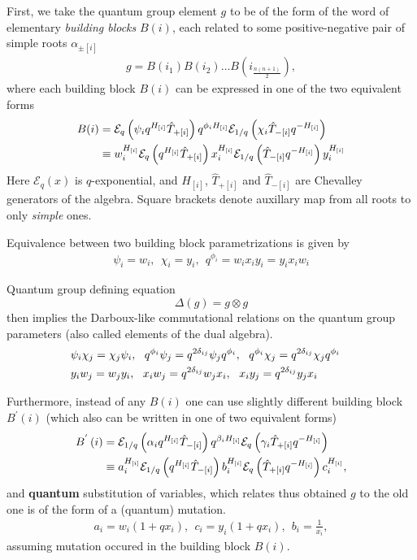 \documentclass{article}
\newcommand{\lb}{\left (}
\newcommand{\rb}{\right )}
\newcommand{\lsb}{\left [}
\newcommand{\rsb}{\right ]}
\newcommand{\be}{\begin{eqnarray}}
\newcommand{\ee}{\end{eqnarray}}
\newcommand {\?}{\textit{???}}
\newcommand{\me}[0]{\mathcal{E}}
\newcommand{\hT}[0]{\hat{T}}
\newcommand{\Bp}[1]{B^{'}\lb #1 \rb}
\def\dg{\Delta (g)}
\def\gog{g \otimes g}
\begin{document}
First, we take the quantum group element $g$ to be of the form
of the word of elementary {\it building blocks} $B(i)$, each related to some positive-negative pair
of simple roots $\alpha_{\pm \lsb i \rsb}$
\be
g = B \lb i_1 \rb B \lb i_2 \rb \dots B \lb i_{\frac{n(n + 1)}{2}} \rb,
\ee
where each building block $B(i)$ can be expressed in one of the two equivalent forms
\begin{align}
B(i) & = \me_q \lb \psi_i q^{H_{[i]}} \hT_{+[i]} \rb q^{\phi_i H_{[i]}} \me_{1/q} \lb \chi_i \hT_{-[i]} q^{-H_{[i]}} \rb \\ \notag
& \equiv
w_i^{H_{[i]}} \me_q \lb q^{H_{[i]}} \hT_{+[i]} \rb x_i^{H_{[i]}} \me_{1/q} \lb \hT_{-[i]} q^{-H_{[i]}} \rb y_i^{H_{[i]}}
\end{align}
Here $\me_q(x)$ is $q$-exponential, and $H_{[i]}$, $\hT_{+[i]}$ and $\hT_{-[i]}$ are Chevalley generators of the algebra.
Square brackets denote auxillary map from all roots to only {\it simple} ones.

Equivalence between two building block parametrizations is given by
\be
\psi_i = w_i,\ \ \chi_i = y_i,\ \ q^{\phi_i} = w_i x_i y_i = y_i x_i w_i
\ee

Quantum group defining equation
\begin{equation}
\label{eq:q-group-def}
\dg = \gog
\end{equation}
 then implies the Darboux-like commutational
relations on the quantum group parameters (also called elements of the dual algebra).
\begin{align}
& \psi_i \chi_j = \chi_j \psi_i, \ \ q^{\phi_i} \psi_j = q^{2 \delta_{ij}} \psi_j q^{\phi_i}, \ \
q^{\phi_i} \chi_j = q^{2 \delta_{ij}} \chi_j q^{\phi_i} & \\ \notag &
y_i w_j = w_j y_i, \ \ x_i w_j = q^{2\delta_{ij}} w_j x_i, \ \ x_i y_j = q^{2\delta_{ij}} y_j x_i
\end{align}

Furthermore, instead of any $B(i)$ one can use slightly different building block $\Bp{i}$
(which also can be written in one of two equivalent forms)
\begin{align}
\Bp{i} & = \me_{1/q} \lb \alpha_i q^{H_{[i]}} \hT_{-[i]} \rb q^{\beta_i H_{[i]}} \me_q \lb \gamma_i \hT_{+[i]} q^{-H_{[i]}} \rb  \\ \notag & \equiv
a_i^{H_{[i]}} \me_{1/q} \lb q^{H_{[i]}} \hT_{-[i]} \rb b_i^{H_{[i]}} \me_q \lb  \hT_{+[i]} q^{-H_{[i]}} \rb c_i^{H_{[i]}},
\end{align}
and {\bf quantum} substitution of variables, which relates thus obtained $g$ to the old one
is of the form of a (quantum) mutation.
\be
a_i = w_i(1 + q x_i), \ \ c_i = y_i(1 + q x_i), \ \ b_i = \frac{1}{x_i},
\ee 
assuming mutation occured in the building block $B(i)$.
\end{document}
